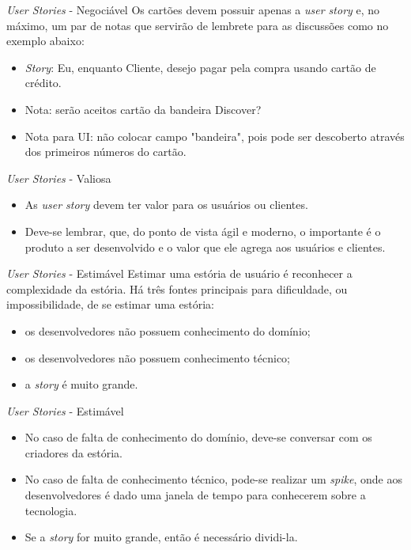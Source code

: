 \documentclass[11pt]{beamer}
\begin{document}
   \begin{frame}{\textit{User Stories} - Negociável}
      Os cartões devem possuir apenas a \textit{user story} e, no máximo, um par de notas que servirão de lembrete para as discussões como no exemplo abaixo:
      \begin{itemize}
         \item \textit{Story}: Eu, enquanto Cliente, desejo pagar pela compra usando cartão de crédito.
         \item Nota: serão aceitos cartão da bandeira Discover?
         \item Nota para UI: não colocar campo "bandeira", pois pode ser descoberto através dos primeiros números do cartão.
      \end{itemize}
   \end{frame}

   \begin{frame}{\textit{User Stories} - Valiosa}
      \begin{itemize}
         \item As \textit{user story} devem ter valor para os usuários ou clientes.
         \item Deve-se lembrar, que, do ponto de vista ágil e moderno, o importante é o produto a ser desenvolvido e o valor que ele agrega aos usuários e clientes.
      \end{itemize}
   \end{frame}

   \begin{frame}{\textit{User Stories} - Estimável}
      Estimar uma estória de usuário é reconhecer a complexidade da estória. Há três fontes principais para dificuldade, ou impossibilidade, de se estimar uma estória:
      \begin{itemize}
         \item os desenvolvedores não possuem conhecimento do domínio;
         \item os desenvolvedores não possuem conhecimento técnico;
         \item a \textit{story} é muito grande.
      \end{itemize}
   \end{frame}

   \begin{frame}{\textit{User Stories} - Estimável}
      \begin{itemize}
         \item No caso de falta de conhecimento do domínio, deve-se conversar com os criadores da estória.
         \item No caso de falta de conhecimento técnico, pode-se realizar um \textit{spike}, onde aos desenvolvedores é dado uma janela de tempo para conhecerem sobre a tecnologia.
         \item Se a \textit{story} for muito grande, então é necessário dividi-la.
      \end{itemize}
   \end{frame}
\end{document}
